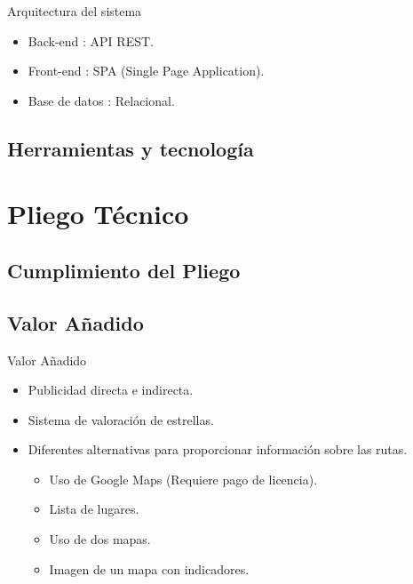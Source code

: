 \documentclass{beamer}
\begin{document}
	\begin{frame}{Arquitectura del sistema}
		\begin{itemize}
			\item {
				Back-end : API REST.
				
			}
			\item {
				Front-end : SPA (Single Page Application).
			}
			\item {
				Base de datos : Relacional.
				
			}
		\end{itemize}
		
		
		\begin{figure}[h]
    		\centering

		\end{figure}
	
	\end{frame}

\subsection{Herramientas y tecnolog\'ia}

\section{Pliego T\'ecnico}

\subsection{Cumplimiento del Pliego}

\subsection{Valor A\~nadido}
	\begin{frame}{Valor A\~nadido}
		\begin{itemize}
				\item {
					Publicidad directa e indirecta.
				
				}
				\item {
					Sistema de valoraci\'on de estrellas.
				}
				\item {
					Diferentes alternativas para proporcionar información sobre las rutas.
					\begin{itemize}
						\item {
							Uso de Google Maps (Requiere pago de licencia).
						}
						\item {
							Lista de lugares.
						}
						\item {
							Uso de dos mapas.
						}
						\item {
							Imagen de un mapa con indicadores.
						}
					\end{itemize}
				}
		\end{itemize}
	
	\end{frame}
\end{document}
